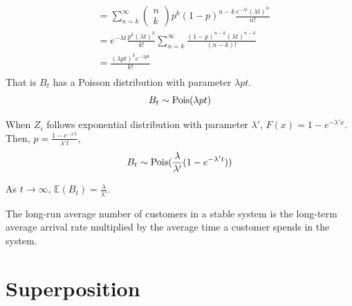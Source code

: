 \documentclass[11pt]{elegantbook}
\begin{document}
\begin{example}
\begin{solution}
\begin{equation}
\begin{aligned}
        &=\sum_{n=k}^\infty \begin{pmatrix}
            n\\
            k
        \end{pmatrix}p^k(1-p)^{n-k}\frac{e^{-\lambda t}(\lambda t)^n}{n!}\\
        &=e^{-\lambda t}\frac{p^k(\lambda t)^k}{k!}\sum_{n=k}^\infty\frac{(1-p)^{n-k}(\lambda t)^{n-k}}{(n-k)!}\\
        &=\frac{(\lambda p t)^ke^{-\lambda pt}}{k!}\\
    \end{aligned}
    \nonumber
\end{equation}
That is $B_t$ has a Poisson distribution with parameter $\lambda p t$.
$$B_t\sim \textnormal{Pois}(\lambda p t)$$
\end{solution}
When $Z_i$ follows exponential distribution with parameter $\lambda'$, $F(x)=1-e^{-\lambda'x}$. Then, $p=\frac{1-e^{-\lambda't}}{\lambda't}$,
$$B_t\sim \textnormal{Pois}(\frac{\lambda}{\lambda'}(1-e^{-\lambda't}))$$

As $t \rightarrow \infty$, $\mathbb{E}(B_t)=\frac{\lambda}{\lambda'}$.

\begin{claim}
    The long-run average number of customers in a stable system is the long-term average arrival rate multiplied by the average time a customer spends in the system.
\end{claim}
\end{example}

\section{Superposition}
\end{document}
